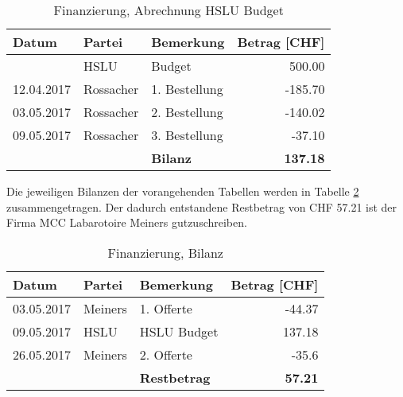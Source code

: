 \begin{table}[H]
	\small
	\centering
	\caption{Finanzierung, Abrechnung HSLU Budget}
	\begin{tabular}{lrlr}
		\hline
		\multicolumn{1}{|l|}{\textbf{Datum}} & \multicolumn{1}{l|}{\textbf{Partei}} & \multicolumn{1}{l|}{\textbf{Bemerkung}} & \multicolumn{1}{l|}{\textbf{Betrag [CHF]}} \\
		\hline
		\multicolumn{1}{|l|}{} & \multicolumn{1}{l|}{HSLU} & \multicolumn{1}{l|}{Budget} & \multicolumn{1}{r|}{500.00} \\
		\hline
		\multicolumn{1}{|l|}{12.04.2017} & \multicolumn{1}{l|}{Rossacher} & \multicolumn{1}{l|}{1. Bestellung} & \multicolumn{1}{r|}{-185.70} \\
		\hline
		\multicolumn{1}{|l|}{03.05.2017} & \multicolumn{1}{l|}{Rossacher} & \multicolumn{1}{l|}{2. Bestellung} & \multicolumn{1}{r|}{-140.02} \\
		\hline
		\multicolumn{1}{|l|}{09.05.2017} & \multicolumn{1}{l|}{Rossacher} & \multicolumn{1}{l|}{3. Bestellung} & \multicolumn{1}{r|}{-37.10} \\
		\hline
		&       & \textbf{Bilanz} & \textbf{137.18} \\
	\end{tabular}%
	\label{tab:Finanzierung_HSLU_Budget}%
\end{table}%

Die jeweiligen Bilanzen der vorangehenden Tabellen werden in Tabelle \ref{tab:Finanzierung_Bilanz} zusammengetragen. Der dadurch entstandene Restbetrag von CHF 57.21 ist der Firma MCC Labarotoire Meiners gutzuschreiben.

\begin{table}[H]
	\small
	\centering
	\caption{Finanzierung, Bilanz}
	\begin{tabular}{lrlr}
		\hline
		\multicolumn{1}{|l|}{\textbf{Datum}} & \multicolumn{1}{l|}{\textbf{Partei}} & \multicolumn{1}{l|}{\textbf{Bemerkung}} & \multicolumn{1}{l|}{\textbf{Betrag [CHF]}} \\
		\hline
		\multicolumn{1}{|l|}{03.05.2017} & \multicolumn{1}{l|}{Meiners} & \multicolumn{1}{l|}{1. Offerte} & \multicolumn{1}{r|}{-44.37} \\
		\hline
		\multicolumn{1}{|l|}{09.05.2017} & \multicolumn{1}{l|}{HSLU} & \multicolumn{1}{l|}{HSLU Budget} & \multicolumn{1}{r|}{137.18} \\
		\hline
		\multicolumn{1}{|l|}{26.05.2017} & \multicolumn{1}{l|}{Meiners} & \multicolumn{1}{l|}{2. Offerte} & \multicolumn{1}{r|}{-35.6} \\
		\hline
		&       & \textbf{Restbetrag} & \textbf{57.21} \\
	\end{tabular}%
	\label{tab:Finanzierung_Bilanz}%
\end{table}%


